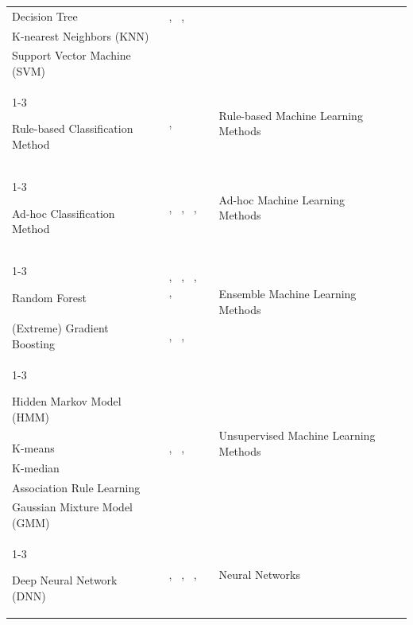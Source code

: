 \documentclass{sfuthesis}
\begin{document}
\begin{appendices}
\begin{landscape}
\begin{longtable}{
p{5.5cm}
p{4cm}
p{6cm}
p{3.5cm}
}
Decision Tree &
~\cite{vandewiele2018decision}, ~\cite{feng2024adaptive}, ~\cite{Tarnowska2022TinnitusTherapy} &
& \\

K-nearest Neighbors (KNN) &
~\cite{Deng2017ScoliosisDSS} &
& \\

Support Vector Machine (SVM) &
~\cite{Deng2017ScoliosisDSS} &
& \\
\cline{1-3}

Rule-based Classification Method &
~\cite{Monti2025RailwayBridgeDSS}, ~\cite{Tarnowska2022TinnitusTherapy} &
Rule-based Machine Learning Methods &
\\
\cline{1-3}

Ad-hoc Classification Method &
~\cite{Zhu2018EducationalDSS}, ~\cite{Tarnowska2022TinnitusTherapy}, ~\cite{leem2023towards}, ~\cite{valdes2017clinical} &
Ad-hoc Machine Learning Methods &
\\
\cline{1-3}

Random Forest &
~\cite{Deng2017ScoliosisDSS}, ~\cite{ataei2024intelligent}, ~\cite{verboven2022treatment}, ~\cite{lee2024machine}, ~\cite{Tarnowska2022TinnitusTherapy} &
\multirow{2}{6cm}{Ensemble Machine Learning Methods} &
\\

(Extreme) Gradient Boosting &
~\cite{Kozielski2021LPGDSS}, ~\cite{makokha2025enhancing}, ~\cite{feng2024adaptive} &
&
\\
\cline{1-3}

Hidden Markov Model (HMM) &
~\cite{song2024building} &
\multirow{5}{6cm}{Unsupervised Machine Learning Methods} &
\\

K-means &
~\cite{Pahuja2024Dexter}, ~\cite{Milic2024DataCenterEnergy}, ~\cite{leem2023towards} &
&
\\

K-median &
~\cite{feng2024adaptive} &
&
\\

Association Rule Learning &
~\cite{Tarnowska2022TinnitusTherapy} &
&
\\

Gaussian Mixture Model (GMM) &
~\cite{cecconi2022data} &
&
\\
\cline{1-3}

Deep Neural Network (DNN) &
~\cite{Han2020WastewaterDecisionMaking}, ~\cite{miao2025research}, ~\cite{wang2023data}, ~\cite{kharazmi2018computer} &
\multirow{4}{6cm}{Neural Networks} &
\\


\end{longtable}
\end{landscape}
\end{appendices}
\end{document}
